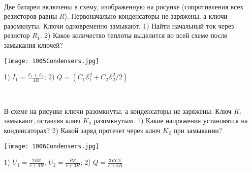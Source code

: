 \begin{ex} 
\hspace{0pt} \\
\begin{minipage}{.65\textwidth}
Две батареи включены в схему, изображенную на рисунке (сопротивления всех резисторов равны $R$). 
Первоначально конденсаторы не заряжены, а ключи разомкнуты. Ключи одновременно замыкают. 
1) Найти начальный ток через резистор $R_1$. 2) Какое количество теплоты выделится во всей схеме после замыкания ключей?
\end{minipage}
\begin{minipage}{.35\textwidth}
\centering
\texttt{[image: 1005Condensers.jpg]}
\end{minipage}
\begin{ans}
1) $I_1=\frac{\mathcal{E}_1 + \mathcal{E}_2}{3R}$; 2) $Q=(C_1 \mathcal{E}_1^2 + C_2 \mathcal{E}_2^2/2)$
\end{ans}
\end{ex}

\begin{ex} 
\hspace{0pt} \\
\begin{minipage}{.65\textwidth}
В схеме на рисунке ключи разомкнуты, а конденсаторы не заряжены. Ключ $K_1$ замыкают, оставляя ключ $K_2$ разомкнутым. 
1) Какие напряжения установятся на конденсаторах? 2) Какой заряд протечет через ключ $K_2$ при замыкании?
\end{minipage}
\begin{minipage}{.35\textwidth}
\centering
\texttt{[image: 1006Condensers.jpg]}
\end{minipage}
\begin{ans}
1) $U_1 = \frac{2R \mathcal{E}}{r+3R}$, $U_2 = \frac{R \mathcal{E}}{r+3R}$; 2) $Q=\frac{3RC\mathcal{E}}{r+3R}$
\end{ans}
\end{ex}
